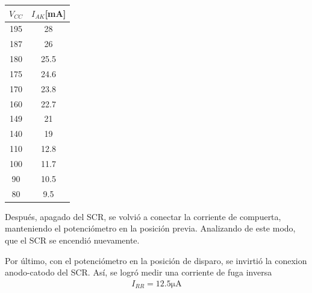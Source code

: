 \begin{minipage}{0.3\linewidth}
\begin{table}[H]
  \begin{center}
    \begin{tabular}{c|c}
      $V_{CC}$ &$I_{AK}$[mA]   \\
      \hline
      195   &28   \\
      187   &26  \\
      180   &25.5  \\
      175   &24.6  \\
      170   &23.8  \\
      160   &22.7  \\
      149   &21  \\
      140   &19  \\
      110   &12.8  \\
      100   &11.7  \\
      90    &10.5  \\
      80    &9.5  \\
    \end{tabular}
  \end{center} 
\end{table}
\end{minipage}
\begin{minipage}{0.7\linewidth}
  \centering
\end{minipage}
\par
Después, apagado del SCR, se volvió a conectar la corriente de compuerta,
manteniendo el potenciómetro en la posición previa. Analizando de este modo, que el SCR 
se encendió nuevamente.
\par
Por último, con el potenciómetro en la posición de disparo, se invirtió la conexion
anodo-catodo del SCR. Así, se logró medir una corriente de fuga inversa
\begin{align}
  I_{RR} = 12.5\unit{\micro\ampere} 
\end{align}
